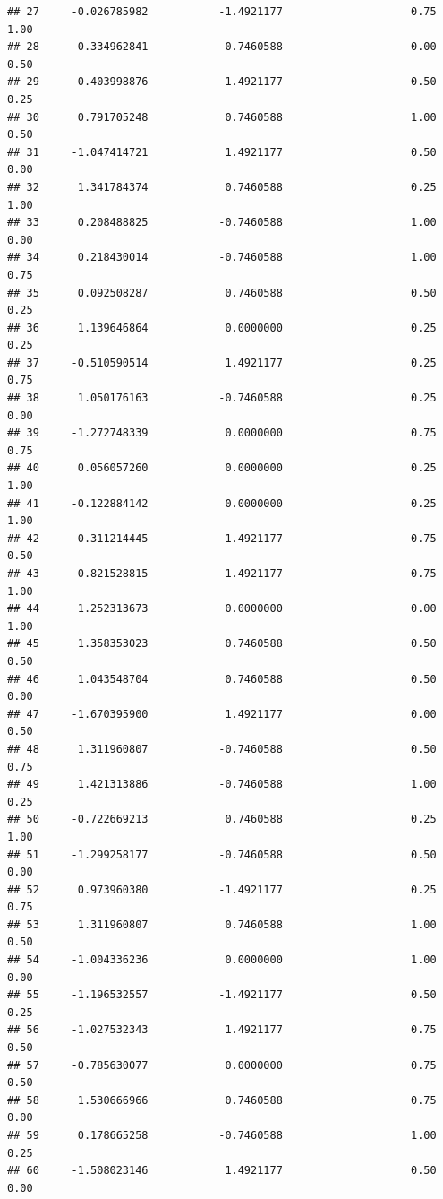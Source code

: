 \documentclass[]{book}
\begin{document}
\begin{verbatim}
## 27     -0.026785982           -1.4921177                    0.75                  1.00
## 28     -0.334962841            0.7460588                    0.00                  0.50
## 29      0.403998876           -1.4921177                    0.50                  0.25
## 30      0.791705248            0.7460588                    1.00                  0.50
## 31     -1.047414721            1.4921177                    0.50                  0.00
## 32      1.341784374            0.7460588                    0.25                  1.00
## 33      0.208488825           -0.7460588                    1.00                  0.00
## 34      0.218430014           -0.7460588                    1.00                  0.75
## 35      0.092508287            0.7460588                    0.50                  0.25
## 36      1.139646864            0.0000000                    0.25                  0.25
## 37     -0.510590514            1.4921177                    0.25                  0.75
## 38      1.050176163           -0.7460588                    0.25                  0.00
## 39     -1.272748339            0.0000000                    0.75                  0.75
## 40      0.056057260            0.0000000                    0.25                  1.00
## 41     -0.122884142            0.0000000                    0.25                  1.00
## 42      0.311214445           -1.4921177                    0.75                  0.50
## 43      0.821528815           -1.4921177                    0.75                  1.00
## 44      1.252313673            0.0000000                    0.00                  1.00
## 45      1.358353023            0.7460588                    0.50                  0.50
## 46      1.043548704            0.7460588                    0.50                  0.00
## 47     -1.670395900            1.4921177                    0.00                  0.50
## 48      1.311960807           -0.7460588                    0.50                  0.75
## 49      1.421313886           -0.7460588                    1.00                  0.25
## 50     -0.722669213            0.7460588                    0.25                  1.00
## 51     -1.299258177           -0.7460588                    0.50                  0.00
## 52      0.973960380           -1.4921177                    0.25                  0.75
## 53      1.311960807            0.7460588                    1.00                  0.50
## 54     -1.004336236            0.0000000                    1.00                  0.00
## 55     -1.196532557           -1.4921177                    0.50                  0.25
## 56     -1.027532343            1.4921177                    0.75                  0.50
## 57     -0.785630077            0.0000000                    0.75                  0.50
## 58      1.530666966            0.7460588                    0.75                  0.00
## 59      0.178665258           -0.7460588                    1.00                  0.25
## 60     -1.508023146            1.4921177                    0.50                  0.00
\end{verbatim}
\end{document}
